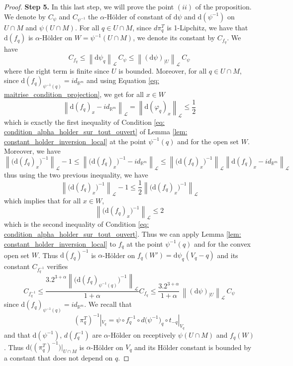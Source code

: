 \documentclass[11pt,reqno,a4paper]{article}%
\theoremstyle{definition}
\theoremstyle{remark}
\renewcommand{\leq}{\leqslant}
\newcommand{\opnorm}[1]{{\left\| #1 \right\|}_{\mathcal{L}}}
\renewcommand{\d}{\mathrm{d}}
\newcommand{\R}{\mathbb{R}}
\renewcommand{\d}{\mathrm{d}}
\begin{document}
\begin{proof}
    
    \noindent \textbf{Step 5.} 
    In this last step, we will prove the point $(ii)$ of the proposition.
    We denote by $C_{\psi}$ and $C_{\psi^{-1}}$ the $\alpha$-Hölder of constant of $\d \psi$ and $\d (\psi^{-1})$ on $U \cap M$ and $\psi(U \cap M)$.
    For all $q \in U \cap M$, since $d \pi_q^T$ is 1-Lipchitz, we have that $\d(f_{q})$ is $\alpha$-Hölder on $W = \psi^{-1}(U \cap M)$, we denote its constant by $C_{f_{q}}$.
    We have 
    \[ C_{f_{q}} \leq \opnorm{\d \psi_{q}} \, C_{\psi} \leq \opnorm{(\d \psi)_{|U}  }\, C_{\psi}\]
    where the right term is finite since $U$ is bounded.
    Moreover, for all $q\in U \cap M$, since $\d (f_{q})_{\psi^{-1}(q)} = id_{\R^m}$ and using Equation \eqref{eq: maitrise_condition_projection}, we get for all $x \in W$
    \[ \opnorm{\d (f_q)_x - id_{\R^m} } = \opnorm{ \d ( \varphi_q)_x } \leq \frac{1}{2}\]
    which is exactly the first inequality of Condition \eqref{eq: condition_alpha_holder_sur_tout_ouvert} of Lemma \ref{lem: constant_holder_inversion_local} at the point $\psi^{-1}(q)$ and for the open set $W$.
    Moreover, we have
    \[ \opnorm{ \big( \d (f_q)_x \big)^{-1} } -1 \leq \opnorm{  \big( \d (f_q)_x \big)^{-1} - id_{\R^m} } \leq \opnorm{ \big( \d (f_q)_x \big)^{-1} }  \opnorm{ \d (f_q)_x - id_{\R^m}  } \]
    thus using the two previous inequality, we have
    \[ \opnorm{ \big( \d (f_q)_x \big)^{-1} } -1 \leq \frac{1}{2} \opnorm{ \big( \d (f_q)_x \big)^{-1} } \]
    which implies that for all $x \in W$,
    \[ \opnorm{ \big( \d (f_q)_x \big)^{-1} } \leq 2\]
    which is the second inequality of Condition \eqref{eq: condition_alpha_holder_sur_tout_ouvert}.
    Thus we can apply Lemma \ref{lem: constant_holder_inversion_local} to $f_{q}$ at the point $\psi^{-1}(q)$ and for the convex open set $W$.
    Thus $\d (f_{q})^{-1}$ is $\alpha$-Hölder on $f_{q}(W') = \d \psi_{q}(V_{q} - q)$ and its constant $C_{f^{-1}_{q}}$ verifies
    \[ C_{f^{-1}_{q}} \leq \frac{3.2^{3+\alpha} \opnorm{ \big(\d (f_{q})_{\psi^{-1}(q)} \big)^{-1} }}{1 + \alpha} C_{f_{q}} \leq \frac{3.2^{3+\alpha}}{1 + \alpha} \, {\opnorm{(\d \psi)_{|U} }} \, C_{\psi}\]
    since $\d (f_{q})_{\psi^{-1}(q)} = id_{\R^m}$.
    We recall that
    $$(\pi_{q}^T)^{-1} |_{V_q} = \psi \circ f_{q}^{-1} \circ d \big(\psi^{-1}\big) _q \circ t_{-q} |_{V_q} $$
    and that $\d (\psi^{-1})$, $d( f_{q}^{-1})$ are $\alpha$-Hölder on receptively $\psi(U \cap M)$ and $f_{q}(W)$.
    Thus $\d \big( (\pi_{q}^T)^{-1} \big) |_{U \cap M}$ is $\alpha$-Hölder on $V_{q}$ and its Hölder constant is bounded by a constant that does not depend on $q$.
\end{proof}
\end{document}
